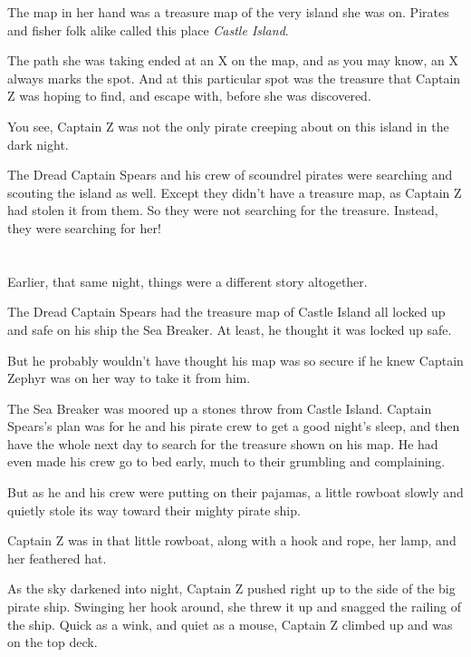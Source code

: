 \documentclass[12pt]{extbook}
\begin{document}
  The map in her hand was a treasure map of the very island she was on.
  Pirates and fisher folk alike called this place \emph{Castle Island}.
  
  The path she was taking ended at an X on the map, and as you may know,
  an X always marks the spot. And at this particular spot was the treasure
  that Captain Z was hoping to find, and escape with, before she was
  discovered.
  
  You see, Captain Z was not the only pirate creeping about on this island
  in the dark night.
  
  The Dread Captain Spears and his crew of scoundrel pirates were
  searching and scouting the island as well. Except they didn't have a
  treasure map, as Captain Z had stolen it from them. So they were not
  searching for the treasure. Instead, they were searching for her!
  
  \section{}\label{section-2}
  
  Earlier, that same night, things were a different story altogether.
  
  The Dread Captain Spears had the treasure map of Castle Island all
  locked up and safe on his ship the Sea Breaker. At least, he thought it
  was locked up safe.
  
  But he probably wouldn't have thought his map was so secure if he knew
  Captain Zephyr was on her way to take it from him.
  
  The Sea Breaker was moored up a stones throw from Castle Island. Captain
  Spears's plan was for he and his pirate crew to get a good night's
  sleep, and then have the whole next day to search for the treasure shown
  on his map. He had even made his crew go to bed early, much to their
  grumbling and complaining.
  
  But as he and his crew were putting on their pajamas, a little rowboat
  slowly and quietly stole its way toward their mighty pirate ship.
  
  Captain Z was in that little rowboat, along with a hook and rope, her
  lamp, and her feathered hat.
  
  As the sky darkened into night, Captain Z pushed right up to the side of
  the big pirate ship. Swinging her hook around, she threw it up and
  snagged the railing of the ship. Quick as a wink, and quiet as a mouse,
  Captain Z climbed up and was on the top deck.
  
\end{document}
